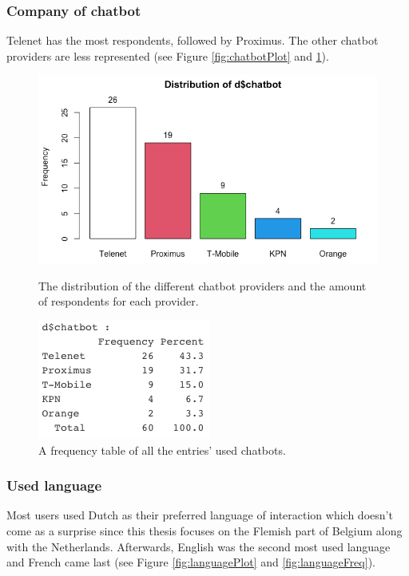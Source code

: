 \subsubsection{Company of chatbot}
Telenet has the most respondents, followed by Proximus. The other chatbot providers are less represented (see Figure \ref{fig:chatbotPlot} and \ref{fig:chatbotFreq}).
\begin{figure}[!htb]
	\includegraphics[width=\linewidth]{../LaTeX/Figures/Environments/ChatbotPlot.png}
	\caption{The distribution of the different chatbot providers and the amount of respondents for each provider.}\label{fig:chatbotPlot}
	\endminipage\hfill
	\includegraphics[width=\linewidth]{../LaTeX/Figures/Environments/ChatbotFreq.png}
	\caption{A frequency table of all the entries' used chatbots.}\label{fig:chatbotFreq}
	\endminipage\hfill
\end{figure}

\subsubsection{Used language}
Most users used Dutch as their preferred language of interaction which doesn't come as a surprise since this thesis focuses on the Flemish part of Belgium along with the Netherlands. Afterwards, English was the second most used language and French came last (see Figure \ref{fig:languagePlot} and \ref{fig:languageFreq}).

